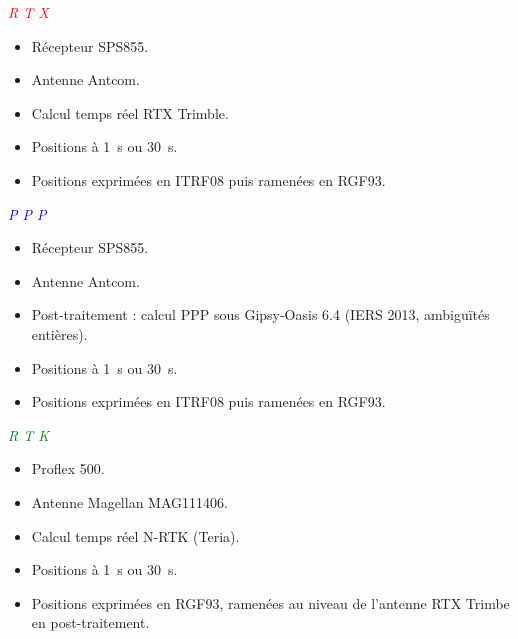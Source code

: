 \documentclass[portrait,final,a0paper,fontscale=0.3]{baposter}
\begin{document}
\begin{poster}
{	\begin{minipage}[t]{0.24\textwidth}
		\vspace{-0.1cm}
		\begin{center}
			\large\textcolor{red}{\emph{R T X}}
		\end{center}
		\small\vspace{-0.4cm}
		\begin{itemize}
			\item Récepteur SPS855.
			\item Antenne Antcom.
			\item Calcul temps réel RTX Trimble.
			\item Positions à 1~s ou 30~s.
			\item Positions exprimées en ITRF08 puis ramenées en RGF93.
		\end{itemize}
	\end{minipage}
	\begin{minipage}[t]{0.24\textwidth}
		\vspace{-0.1cm}
		\begin{center}
			\large\textcolor{blue}{\emph{P P P}}
		\end{center}
		\small\vspace{-0.4cm}
		\begin{itemize}
			\item Récepteur SPS855.
			\item Antenne Antcom.
			\item Post-traitement : calcul PPP sous Gipsy-Oasis 6.4 (IERS 2013, ambiguïtés entières).
			\item Positions à 1~s ou 30~s.
			\item Positions exprimées en ITRF08 puis ramenées en RGF93.
		\end{itemize}
	\end{minipage}
	\begin{minipage}[t]{0.24\textwidth}
		\vspace{-0.1cm}
		\begin{center}
			\large\textcolor{green}{\emph{R T K}}
		\end{center}
		\small\vspace{-0.4cm}
		\begin{itemize}
			\item Proflex 500.
			\item Antenne Magellan MAG111406.
			\item Calcul temps réel N-RTK (Teria).
			\item Positions à 1~s ou 30~s.
			\item Positions exprimées en RGF93, ramenées au niveau de l'antenne RTX Trimbe en post-traitement.

\end{itemize}
\end{minipage}}
\end{poster}
\end{document}
